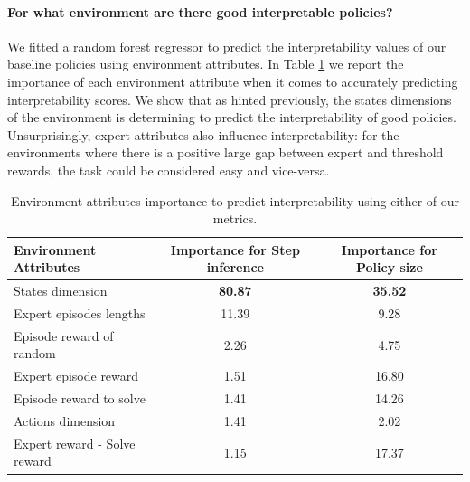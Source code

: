\paragraph{For what environment are there good interpretable policies?}
We fitted a random forest regressor \cite{random} to predict the interpretability values of our baseline policies using environment attributes. 
In Table \ref{tab:combined_importance} we report the importance of each environment attribute when it comes to accurately predicting interpretability scores.
We show that as hinted previously, the states dimensions of the environment is determining to predict the interpretability of good policies.
Unsurprisingly, expert attributes also influence interpretability: for the environments where there is a positive large gap between expert and threshold rewards, the task could be considered easy and vice-versa.

\begin{table}
\centering
\small
\begin{tabular}{lcc}
\toprule
Environment Attributes & Importance for Step inference & Importance for Policy size \\
\midrule
States dimension & \textbf{80.87} & \textbf{35.52} \\
Expert episodes lengths & 11.39 & 9.28 \\
Episode reward of random & 2.26 & 4.75 \\
Expert episode reward & 1.51 & 16.80 \\
Episode reward to solve & 1.41 & 14.26 \\
Actions dimension & 1.41 & 2.02 \\
Expert reward - Solve reward & 1.15 & 17.37 \\
\bottomrule
\end{tabular}
\caption{Environment attributes importance to predict interpretability using either of our metrics.}
\label{tab:combined_importance}
\end{table}

